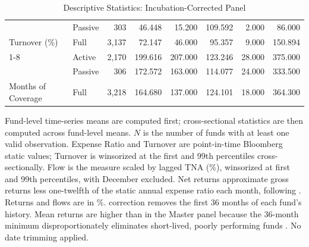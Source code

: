 \begin{table}[!htbp]
{\begin{tabular}[t]{llrrrrrr}
 & Passive & 303 & 46.448 & 15.200 & 109.592 & 2.000 & 86.000\\

\multirow{-3}{*}{\raggedright\arraybackslash Turnover (\%)} & Full & 3,137 & 72.147 & 46.000 & 95.357 & 9.000 & 150.894\\
\cmidrule{1-8}
 & Active & 2,170 & 199.616 & 207.000 & 123.246 & 28.000 & 375.000\\

 & Passive & 306 & 172.572 & 163.000 & 114.077 & 24.000 & 333.500\\

\multirow{-3}{*}{\raggedright\arraybackslash Months of Coverage} & Full & 3,218 & 164.680 & 137.000 & 124.101 & 18.000 & 364.300\\
\bottomrule
\end{tabular}%
}\sbefit
\setlength{\tabletempwidth}{\wd\tabletempbox}
\ifdim\tabletempwidth>\linewidth\setlength{\tabletempwidth}{\linewidth}\fi
\begin{minipage}{\tabletempwidth}
\captionsetup{width=\linewidth}
\caption{\label{tab:desc_stats_incub}Descriptive Statistics: Incubation-Corrected Panel}
\ifdim\wd\tabletempbox>\linewidth
  \resizebox{\linewidth}{!}{\usebox{\tabletempbox}}
\else
  \usebox{\tabletempbox}
\fi
\par\medskip
\begin{singlespace}\tablefont\noindent
Fund-level time-series means are computed first; cross-sectional statistics are then computed across fund-level means. $N$ is the number of funds with at least one valid observation. Expense Ratio and Turnover are point-in-time Bloomberg static values; Turnover is winsorized at the first and 99th percentiles cross-sectionally. Flow is the \citet{SirriTufano1998} measure scaled by lagged TNA (\%), winsorized at first and 99th percentiles, with December excluded. Net returns approximate gross returns less one-twelfth of the static annual expense ratio each month, following \citet{BarrasScailletWermers2010}. Returns and flows are in \%. \citet{Evans2010} correction removes the first 36 months of each fund's history. Mean returns are higher than in the Master panel because the 36-month minimum disproportionately eliminates short-lived, poorly performing funds \citep{Evans2010}. No date trimming applied.
\end{singlespace}
\end{minipage}
\end{table}
